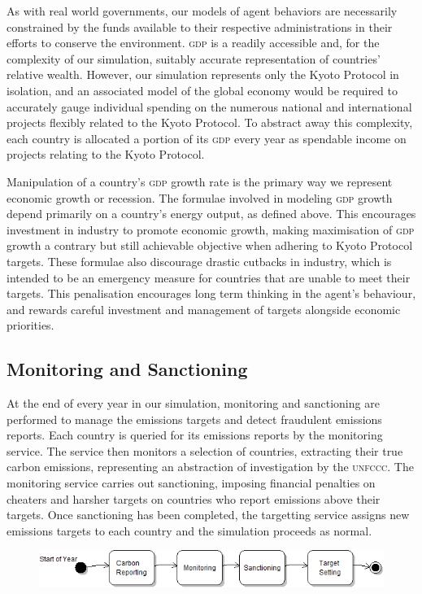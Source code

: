 As with real world governments, our models of agent behaviors are necessarily constrained by the funds available to their respective administrations in their efforts to conserve the environment. \textsc{gdp} is a readily accessible and, for the complexity of our simulation, suitably accurate representation of countries' relative wealth. However, our simulation represents only the Kyoto Protocol in isolation, and an associated model of the global economy would be required to accurately gauge individual spending on the numerous national and international projects flexibly related to the Kyoto Protocol. To abstract away this complexity, each country is allocated a portion of its \textsc{gdp} every year as spendable income on projects relating to the Kyoto Protocol.

Manipulation of a country's \textsc{gdp} growth rate is the primary way we represent economic growth or recession. The formulae involved in modeling \textsc{gdp} growth depend primarily on a country's energy output, as defined above. This encourages investment in industry to promote economic growth, making maximisation of \textsc{gdp} growth a contrary but still achievable objective when adhering to Kyoto Protocol targets. These formulae also discourage drastic cutbacks in industry, which is intended to be an emergency measure for countries that are unable to meet their targets. This penalisation encourages long term thinking in the agent's behaviour, and rewards careful investment and management of targets alongside economic priorities.

\subsection{Monitoring and Sanctioning}
At the end of every year in our simulation, monitoring and sanctioning are performed to manage the emissions targets and detect fraudulent emissions reports. Each country is queried for its emissions reports by the monitoring service. The service then monitors a selection of countries, extracting their true carbon emissions, representing an abstraction of investigation by the \textsc{unfccc}. The monitoring service carries out sanctioning, imposing financial penalties on cheaters and harsher targets on countries who report emissions above their targets. Once sanctioning has been completed, the targetting service assigns new emissions targets to each country and the simulation proceeds as normal.

\begin{figure}[h!]
	\centering
	\includegraphics[width=\textwidth]{img/Kyoto_4_states.png}
	\caption{}
	\label{fig:kyoto_4_states}
\end{figure}

